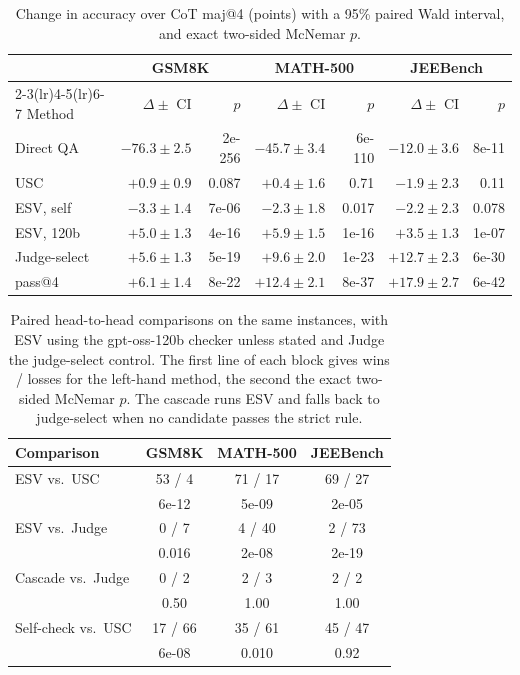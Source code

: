 \documentclass[letterpaper]{article} %
\newcommand{\method}{\textsc{ESV}}   %
\begin{document}
\begin{table}[t]
\centering
\small
\setlength{\tabcolsep}{3pt}
\begin{tabular}{lrrrrrr}
\toprule
 & \multicolumn{2}{c}{GSM8K} & \multicolumn{2}{c}{MATH-500} & \multicolumn{2}{c}{JEEBench} \\
\cmidrule(lr){2-3}\cmidrule(lr){4-5}\cmidrule(lr){6-7}
Method & $\Delta \pm$ CI & $p$ & $\Delta \pm$ CI & $p$ & $\Delta \pm$ CI & $p$ \\
\midrule
Direct QA & $-76.3 \pm 2.5$ & 2e-256 & $-45.7 \pm 3.4$ & 6e-110 & $-12.0 \pm 3.6$ & 8e-11 \\
USC & $+0.9 \pm 0.9$ & 0.087 & $+0.4 \pm 1.6$ & 0.71 & $-1.9 \pm 2.3$ & 0.11 \\
ESV, self & $-3.3 \pm 1.4$ & 7e-06 & $-2.3 \pm 1.8$ & 0.017 & $-2.2 \pm 2.3$ & 0.078 \\
ESV, 120b & $+5.0 \pm 1.3$ & 4e-16 & $+5.9 \pm 1.5$ & 1e-16 & $+3.5 \pm 1.3$ & 1e-07 \\
Judge-select & $+5.6 \pm 1.3$ & 5e-19 & $+9.6 \pm 2.0$ & 1e-23 & $+12.7 \pm 2.3$ & 6e-30 \\
pass@4 & $+6.1 \pm 1.4$ & 8e-22 & $+12.4 \pm 2.1$ & 8e-37 & $+17.9 \pm 2.7$ & 6e-42 \\
\bottomrule
\end{tabular}
\caption{Change in accuracy over CoT maj@4 (points) with a 95\% paired Wald interval, and exact two-sided McNemar $p$.}
\label{tab:pvalues}
\end{table}

\begin{table}[!ht]
\centering
\small
\setlength{\tabcolsep}{4pt}
\begin{tabular}{@{}lccc@{}}
\toprule
Comparison & GSM8K & MATH-500 & JEEBench \\
\midrule
\method{} vs.\ USC   & 53 / 4 & 71 / 17 & 69 / 27 \\
                     & 6e-12 & 5e-09 & 2e-05 \\
\method{} vs.\ Judge & 0 / 7 & 4 / 40 & 2 / 73 \\
                     & 0.016 & 2e-08 & 2e-19 \\
Cascade vs.\ Judge   & 0 / 2 & 2 / 3 & 2 / 2 \\
                     & 0.50 & 1.00 & 1.00 \\
Self-check vs.\ USC  & 17 / 66 & 35 / 61 & 45 / 47 \\
                     & 6e-08 & 0.010 & 0.92 \\
\bottomrule
\end{tabular}
\caption{Paired head-to-head comparisons on the same instances, with \method{}
using the gpt-oss-120b checker unless stated and Judge the judge-select control.
The first line of each block gives wins / losses for the left-hand method, the
second the exact two-sided McNemar $p$. The cascade runs \method{} and falls
back to judge-select when no candidate passes the strict rule.}
\label{tab:h2h}
\end{table}
\end{document}
